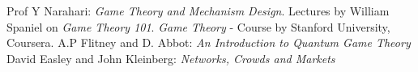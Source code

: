 \documentclass{article}
\theoremstyle{definition}
\begin{document}
%




\begin{thebibliography}{9}
Prof Y Narahari: \textit{Game Theory and Mechanism Design}.
Lectures by William Spaniel on \textit{Game Theory 101}. 
\textit{Game Theory} - Course by Stanford University, Coursera.
A.P Flitney and D. Abbot: \textit{An Introduction to Quantum Game Theory}
David Easley and John Kleinberg: \textit{Networks, Crowds and Markets}
\end{thebibliography}
\end{document}
